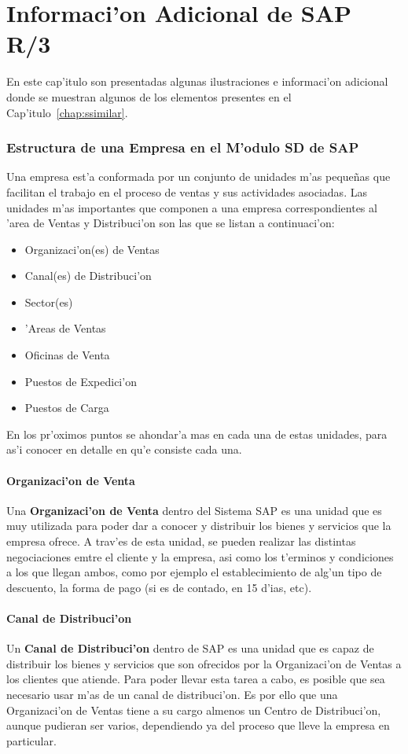 \chapter{Informaci'on Adicional de SAP R/3}

	En este cap'itulo son presentadas algunas ilustraciones e informaci'on adicional donde se muestran algunos de los elementos presentes en el Cap'itulo~\ref{chap:ssimilar}.

\subsection{Estructura de una Empresa en el M'odulo SD de SAP}
Una empresa est'a conformada por un conjunto de unidades m'as peque\~nas que facilitan el trabajo en el proceso de ventas y sus actividades asociadas.
\newline
Las unidades m'as importantes que componen a una empresa correspondientes al 'area de Ventas y Distribuci'on son las que se listan a continuaci'on:

\begin{itemize}
\item Organizaci'on(es) de Ventas
\item Canal(es) de Distribuci'on
\item Sector(es)
\item 'Areas de Ventas
\item Oficinas de Venta
\item Puestos de Expedici'on
\item Puestos de Carga
\end{itemize}

	En los pr'oximos puntos se ahondar'a mas en cada una de estas unidades, para as'i conocer en detalle en qu'e consiste cada una.
	
\subsubsection{Organizaci'on de Venta}
	Una \textbf{Organizaci'on de Venta} dentro del Sistema SAP es una unidad que es muy utilizada para poder dar a conocer y distribuir los bienes y servicios que la empresa ofrece. A trav'es de esta unidad, se pueden realizar las distintas negociaciones emtre el cliente y la empresa, asi como los t'erminos y condiciones a los que llegan ambos, como por ejemplo el establecimiento de alg'un tipo de descuento, la forma de pago (si es de contado, en 15 d'ias, etc). 
	
\subsubsection{Canal de Distribuci'on}
	Un \textbf{Canal de Distribuci'on} dentro de SAP es una unidad que es capaz de distribuir los bienes y servicios que son ofrecidos por la Organizaci'on de Ventas a los clientes que atiende.
	Para poder llevar esta tarea a cabo, es posible que sea necesario usar m'as de un canal de distribuci'on. Es por ello que una Organizaci'on de Ventas tiene a su cargo almenos un Centro de Distribuci'on, aunque pudieran ser varios, dependiendo ya del proceso que lleve la empresa en particular.

